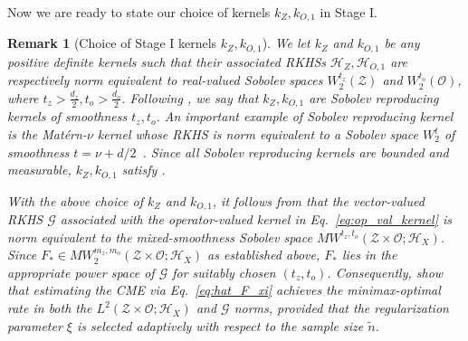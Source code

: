 \documentclass[11pt]{article}
\newcommand{\calZ}{\mathcal{Z}}
\newcommand{\calH}{\mathcal{H}}
\newcommand{\calG}{\mathcal{G}}
\newcommand{\calO}{\mathcal{O}}
\newcommand{\0}{\mathbf{0}}
\newcommand{\steve}[1]{#1}
\newtheorem{rem}{Remark}[section]
\begin{document}
\vspace{1mm}
Now we are ready to state our choice of kernels $k_Z, k_{O,1}$ in Stage I.
\begin{rem}[Choice of Stage I kernels $k_Z, k_{O,1}$]
\label{rem:kernel_stage_1_choice}
\steve{We let $k_{Z}$ and $k_{O, 1}$ be any positive definite kernels} such that their associated RKHSs \steve{$\calH_{Z}, \calH_{O,1}$} are \steve{respectively} norm equivalent to real-valued Sobolev spaces $W_2^{t_z}(\calZ)$ and $W_2^{t_o}(\calO)$, where $t_z > \frac{d_z}{2},t_o > \frac{d_o}{2}$. Following \cite{chen2025nested}, we say that $k_{Z}, k_{O, 1}$ are Sobolev reproducing kernels of smoothness $t_z, t_o$. An important example of Sobolev reproducing kernel is the Matérn-$\nu$ kernel whose RKHS is norm equivalent to a Sobolev space $W^{t}_2$ of smoothness $t = \nu+d/2$~\citep[Corollary 10.48]{wendland2004scattered}. Since all Sobolev reproducing kernels are bounded and measurable, $k_{Z}, k_{O,1}$ satisfy . 

With the above choice of $k_Z$ and $k_{O,1}$, it follows from  that the vector-valued RKHS $\calG$ associated with the operator-valued kernel in Eq.~\eqref{eq:op_val_kernel} is norm equivalent to the mixed-smoothness Sobolev space $MW^{t_z,t_o}(\calZ\times\calO;\calH_X)$.
Since $F_\ast \in MW^{m_z,m_o}_2(\calZ\times\calO;\calH_X)$ as established above, $F_\ast$ lies in the appropriate power space of $\calG$ for suitably chosen $(t_z,t_o)$.
Consequently, \citet{lietal2022optimal,meunier2024optimalratesvectorvaluedspectral} show that estimating the CME via Eq.~\eqref{eq:hat_F_xi} achieves the minimax-optimal rate in both the $L^2(\calZ\times\calO;\calH_X)$ and $\calG$ norms, provided that the regularization parameter $\xi$ is selected adaptively with respect to the sample size $\tilde{n}$. 
\end{rem}
\end{document}
